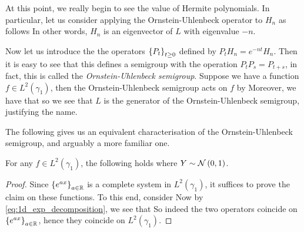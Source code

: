 \documentclass[../main.tex]{subfiles}
\begin{document}
At this point, we really begin to see the value of Hermite polynomials. In particular, let us consider applying the Ornstein-Uhlenbeck operator to $H_n$ as follows  In other words, $H_n$ is an eigenvector of $L$ with eigenvalue $-n$.

Now let us introduce the the operators $\cbr{P_t}_{t\geq0}$ defined by $P_tH_n = e^{-nt}H_n$. Then it is easy to see that this defines a semigroup with the operation $P_tP_s = P_{t+s}$, in fact, this is called the \emph{Ornstein-Uhlenbeck semigroup}. Suppose we have a function $f\in L^2(\gamma_1)$, then the Ornstein-Uhlenbeck semigroup acts on $f$ by  Moreover, we have that  so we see that $L$ is the generator of the Ornstein-Uhlenbeck semigroup, justifying the name.

The following gives us an equivalent characterisation of the Ornstein-Uhlenbeck semigroup, and arguably a more familiar one.
\begin{proposition}
\label{prop:1d_Mehler}
For any $f\in L^2(\gamma_1)$, the following holds  where $Y\sim \mathcal{N}\del{0,1}$.
\end{proposition}
\begin{proof}
Since $\cbr{e^{ax}}_{a\in\R}$ is a complete system in $L^2(\gamma_1)$, it suffices to prove the claim on these functions. To this end, consider  Now by \eqref{eq:1d_exp_decomposition}, we see that  So indeed the two operators coincide on $\cbr{e^{ax}}_{a\in\R}$, hence they coincide on $L^2(\gamma_1)$.
\end{proof}
\end{document}
